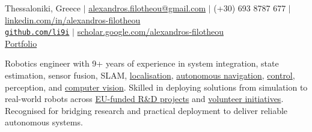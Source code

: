 \documentclass[a4paper,10pt,twoside]{article}
\begin{document}

\par{\bigskip\par}

\begin{center}
  {\footnotesize Thessaloniki, Greece $|$ \href{mailto:alexandros.filotheou@gmail.com}{alexandros.filotheou@gmail.com} $|$ (+30) 693 8787 677 $|$ \href{https://www.linkedin.com/in/alexandros-filotheou-5b6a8676/}{linkedin.com/in/alexandros-filotheou} \\ \href{https://github.com/li9i/}{\texttt{github.com/li9i}} $|$  \href{https://scholar.google.com/citations?hl=en&user=9_hI4hMAAAAJ&view_op=list_works}{scholar.google.com/alexandros-filotheou} \\ \href{https://mozilla.github.io/pdf.js/web/viewer.html?file=https://raw.githubusercontent.com/li9i/portfolio/master/portfolio.pdf}{Portfolio} \\}\vspace{1em}
\end{center}

\vspace{-3em}
\begin{bw_box} \small
  Robotics engineer with 9+ years of experience in system integration, state estimation, sensor fusion, SLAM, \href{https://github.com/li9i/fsm-lo}{localisation}, \href{https://link.springer.com/article/10.1007/s10846-019-01086-y}{autonomous navigation}, \href{https://www.tandfonline.com/doi/full/10.1080/00207179.2018.1514129}{control}, perception, and \href{https://github.com/li9i/pandora\_vision\_2014}{computer vision}. Skilled in deploying solutions from simulation to real-world robots across \href{https://www.robetarme-project.eu/}{EU-funded R\&D projects} and \href{https://issel.ee.auth.gr/pandora-robotics/}{volunteer initiatives}. Recognised for bridging research and practical deployment to deliver reliable autonomous systems.
\end{bw_box}

\end{document}
